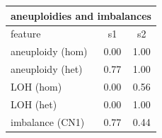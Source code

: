 \documentclass{standalone}
\begin{document}
\begin{tabular}{|l|c|c|}
\hline
\multicolumn{3}{|c|}{\textbf{aneuploidies and imbalances}}\\
\hline 

feature & s1 & s2 \\
\hline
aneuploidy (hom) & 0.00 & 1.00 \\
aneuploidy (het) & 0.77 & 1.00 \\
LOH (hom) & 0.00 & 0.56 \\
LOH (het) & 0.00 & 1.00 \\
imbalance (CN1) & 0.77 & 0.44 \\
\hline
\end{tabular}
\end{document}
